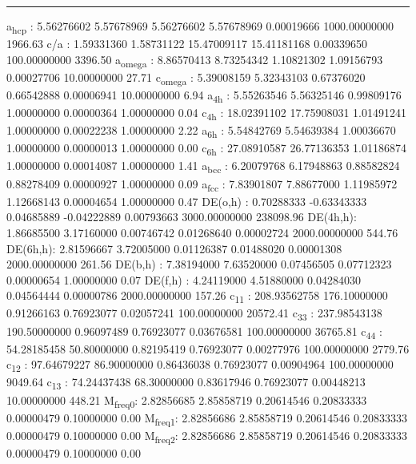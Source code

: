\documentclass[11pt]{article}
\begin{document}
\noindent\rule{\textwidth}{0.5pt}
a\textsubscript{hcp}   :   5.56276602   5.57678969   5.56276602   5.57678969   0.00019666 1000.00000000      1966.63
c/a     :   1.59331360   1.58731122  15.47009117  15.41181168   0.00339650 100.00000000      3396.50
a\textsubscript{omega} :   8.86570413   8.73254342   1.10821302   1.09156793   0.00027706  10.00000000        27.71
c\textsubscript{omega} :   5.39008159   5.32343103   0.67376020   0.66542888   0.00006941  10.00000000         6.94
a\textsubscript{4h}    :   5.55263546   5.56325146   0.99809176   1.00000000   0.00000364   1.00000000         0.04
c\textsubscript{4h}    :  18.02391102  17.75908031   1.01491241   1.00000000   0.00022238   1.00000000         2.22
a\textsubscript{6h}    :   5.54842769   5.54639384   1.00036670   1.00000000   0.00000013   1.00000000         0.00
c\textsubscript{6h}    :  27.08910587  26.77136353   1.01186874   1.00000000   0.00014087   1.00000000         1.41
a\textsubscript{bcc}   :   6.20079768   6.17948863   0.88582824   0.88278409   0.00000927   1.00000000         0.09
a\textsubscript{fcc}   :   7.83901807   7.88677000   1.11985972   1.12668143   0.00004654   1.00000000         0.47
DE(o,h) :   0.70288333  -0.63343333   0.04685889  -0.04222889   0.00793663 3000.00000000    238098.96
DE(4h,h):   1.86685500   3.17160000   0.00746742   0.01268640   0.00002724 2000.00000000       544.76
DE(6h,h):   2.81596667   3.72005000   0.01126387   0.01488020   0.00001308 2000.00000000       261.56
DE(b,h) :   7.38194000   7.63520000   0.07456505   0.07712323   0.00000654   1.00000000         0.07
DE(f,h) :   4.24119000   4.51880000   0.04284030   0.04564444   0.00000786 2000.00000000       157.26
c\textsubscript{11}    : 208.93562758 176.10000000   0.91266163   0.76923077   0.02057241 100.00000000     20572.41
c\textsubscript{33}    : 237.98543138 190.50000000   0.96097489   0.76923077   0.03676581 100.00000000     36765.81
c\textsubscript{44}    :  54.28185458  50.80000000   0.82195419   0.76923077   0.00277976 100.00000000      2779.76
c\textsubscript{12}    :  97.64679227  86.90000000   0.86436038   0.76923077   0.00904964 100.00000000      9049.64
c\textsubscript{13}    :  74.24437438  68.30000000   0.83617946   0.76923077   0.00448213  10.00000000       448.21
M\textsubscript{freq}\textsubscript{0}:   2.82856685   2.85858719   0.20614546   0.20833333   0.00000479   0.10000000         0.00
M\textsubscript{freq}\textsubscript{1}:   2.82856686   2.85858719   0.20614546   0.20833333   0.00000479   0.10000000         0.00
M\textsubscript{freq}\textsubscript{2}:   2.82856686   2.85858719   0.20614546   0.20833333   0.00000479   0.10000000         0.00
\end{document}
